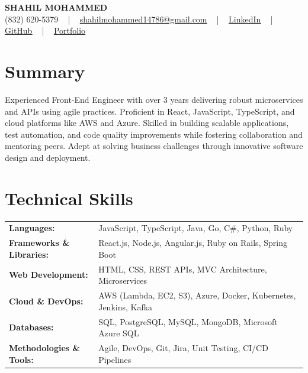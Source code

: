 \documentclass[letterpaper,11pt]{article}
\begin{document}
\begin{center}
    {\fontsize{14pt}{12pt}\selectfont \textbf{\MakeUppercase{Shahil Mohammed}}}\\ \vspace{2pt}
    \fontsize{10pt}{12pt}\selectfont (832) 620-5379 ~ | ~ \href{mailto:shahilmohammed14786@gmail.com}{shahilmohammed14786@gmail.com} ~ | ~  
    \href{https://www.linkedin.com/in/shahil-mohammed-9652931a1/}{\color{blue}\underline{LinkedIn}}  ~ | ~ 
    \href{https://github.com/freakbeast14}{\color{blue}\underline{GitHub}} ~ | ~ 
    \href{https://shahil-mohammed.netlify.app/}{\color{blue}\underline{Portfolio}}
    \vspace{-8pt}
\end{center}

\section{Summary}
\fontsize{9pt}{10pt}\selectfont
Experienced Front-End Engineer with over 3 years delivering robust microservices and APIs using agile practices. Proficient in React, JavaScript, TypeScript, and cloud platforms like AWS and Azure. Skilled in building scalable applications, test automation, and code quality improvements while fostering collaboration and mentoring peers. Adept at solving business challenges through innovative software design and deployment.
 \vspace{-5pt}
 
\section{Technical Skills}
        \vspace{-14pt}
        \begin{table}[h]
            \fontsize{9pt}{10pt}\selectfont
            \begin{tabular}{p{0.3\linewidth} p{0.7\linewidth}}
                \textbf{Languages:} & JavaScript, TypeScript, Java, Go, C\#, Python, Ruby \\
                \textbf{Frameworks \& Libraries:} & React.js, Node.js, Angular.js, Ruby on Rails, Spring Boot \\
                \textbf{Web Development:} & HTML, CSS, REST APIs, MVC Architecture, Microservices \\
                \textbf{Cloud \& DevOps:} & AWS (Lambda, EC2, S3), Azure, Docker, Kubernetes, Jenkins, Kafka \\
                \textbf{Databases:} & SQL, PostgreSQL, MySQL, MongoDB, Microsoft Azure SQL \\
                \textbf{Methodologies \& Tools:} & Agile, DevOps, Git, Jira, Unit Testing, CI/CD Pipelines \\
            \end{tabular}
        \end{table}
 \vspace{-15pt}
 
\end{document}

